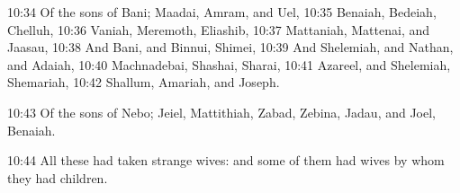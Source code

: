 10:34 Of the sons of Bani; Maadai, Amram, and Uel, 10:35 Benaiah, Bedeiah, Chelluh, 10:36 Vaniah, Meremoth, Eliashib, 10:37 Mattaniah, Mattenai, and Jaasau, 10:38 And Bani, and Binnui, Shimei, 10:39 And Shelemiah, and Nathan, and Adaiah, 10:40 Machnadebai, Shashai, Sharai, 10:41 Azareel, and Shelemiah, Shemariah, 10:42 Shallum, Amariah, and Joseph.

10:43 Of the sons of Nebo; Jeiel, Mattithiah, Zabad, Zebina, Jadau, and Joel, Benaiah.

10:44 All these had taken strange wives: and some of them had wives by whom they had children.

